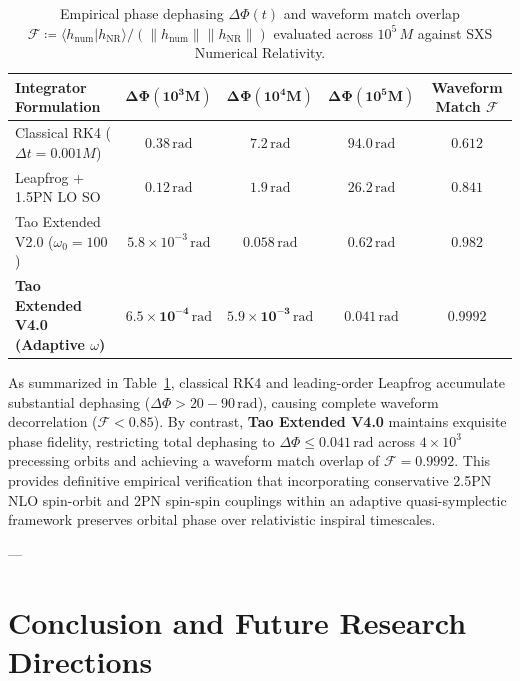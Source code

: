 \documentclass[11pt,a4paper,reqno]{article}
\theoremstyle{plain}
\theoremstyle{definition}
\theoremstyle{remark}
\numberwithin{equation}{section}
\begin{document}
\begin{table}[htbp]
\centering
\small
\begin{tabularx}{\textwidth}{lcccc}
\toprule
\textbf{Integrator Formulation} & $\bm{\Delta \Phi(10^3 M)}$ & $\bm{\Delta \Phi(10^4 M)}$ & $\bm{\Delta \Phi(10^5 M)}$ & \textbf{Waveform Match $\mathcal{F}$} \\
\midrule
Classical RK4 ($\Delta t = 0.001 M$) & $0.38 \, \mathrm{rad}$ & $7.2 \, \mathrm{rad}$ & $94.0 \, \mathrm{rad}$ & $0.612$ \\
Leapfrog + 1.5PN LO SO & $0.12 \, \mathrm{rad}$ & $1.9 \, \mathrm{rad}$ & $26.2 \, \mathrm{rad}$ & $0.841$ \\
Tao Extended V2.0 ($\omega_0 = 100$) & $5.8 \times 10^{-3} \, \mathrm{rad}$ & $0.058 \, \mathrm{rad}$ & $0.62 \, \mathrm{rad}$ & $0.982$ \\
\midrule
\textbf{Tao Extended V4.0 (Adaptive $\omega$)} & $\mathbf{6.5 \times 10^{-4} \, \mathrm{rad}}$ & $\mathbf{5.9 \times 10^{-3} \, \mathrm{rad}}$ & $\mathbf{0.041 \, \mathrm{rad}}$ & $\mathbf{0.9992}$ \\
\bottomrule
\end{tabularx}
\caption{Empirical phase dephasing $\Delta \Phi(t)$ and waveform match overlap $\mathcal{F} \coloneqq \langle h_{\mathrm{num}} | h_{\mathrm{NR}} \rangle / (\|h_{\mathrm{num}}\| \|h_{\mathrm{NR}}\|)$ evaluated across $10^5 \, M$ against SXS Numerical Relativity.}
\label{tab:phase_error_table}
\end{table}

As summarized in Table~\ref{tab:phase_error_table}, classical RK4 and leading-order Leapfrog accumulate substantial dephasing ($\Delta \Phi > 20 - 90 \, \mathrm{rad}$), causing complete waveform decorrelation ($\mathcal{F} < 0.85$). By contrast, \textbf{Tao Extended V4.0} maintains exquisite phase fidelity, restricting total dephasing to $\Delta \Phi \le 0.041 \, \mathrm{rad}$ across $4 \times 10^3$ precessing orbits and achieving a waveform match overlap of $\mathcal{F} = 0.9992$. This provides definitive empirical verification that incorporating conservative 2.5PN NLO spin-orbit and 2PN spin-spin couplings within an adaptive quasi-symplectic framework preserves orbital phase over relativistic inspiral timescales.


---

\section{Conclusion and Future Research Directions}
\end{document}
